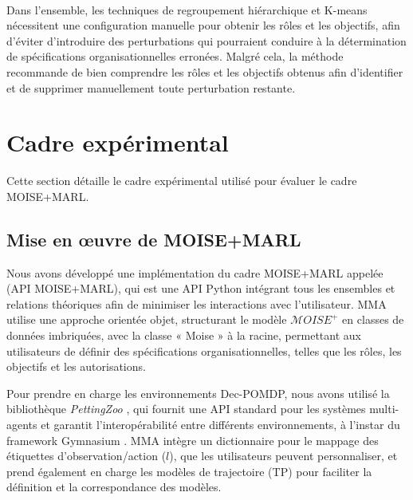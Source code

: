 \

Dans l'ensemble, les techniques de regroupement hiérarchique et K-means nécessitent une configuration manuelle pour obtenir les rôles et les objectifs, afin d'éviter d'introduire des perturbations qui pourraient conduire à la détermination de spécifications organisationnelles erronées. Malgré cela, la méthode recommande de bien comprendre les rôles et les objectifs obtenus afin d'identifier et de supprimer manuellement toute perturbation restante.

\section{Cadre expérimental}
\label{sec:experimental_setup}

Cette section détaille le cadre expérimental utilisé pour évaluer le cadre MOISE+MARL.%

\subsection{Mise en œuvre de MOISE+MARL}

Nous avons développé une implémentation du cadre MOISE+MARL appelée ~\hyperref[fn:github]{\footnotemark[1]} (API MOISE+MARL), qui est une API Python intégrant tous les ensembles et relations théoriques afin de minimiser les interactions avec l'utilisateur. MMA utilise une approche orientée objet, structurant le modèle $\mathcal{M}OISE^+$ en classes de données imbriquées, avec la classe « Moise » à la racine, permettant aux utilisateurs de définir des spécifications organisationnelles, telles que les rôles, les objectifs et les autorisations.

Pour prendre en charge les environnements Dec-POMDP, nous avons utilisé la bibliothèque \textit{PettingZoo} \cite{terry2020pettingzoo}, qui fournit une API standard pour les systèmes multi-agents et garantit l'interopérabilité entre différents environnements, à l'instar du framework Gymnasium \cite{kwiatkowski2024}. MMA intègre un dictionnaire pour le mappage des étiquettes d'observation/action ($l$), que les utilisateurs peuvent personnaliser, et prend également en charge les modèles de trajectoire (TP) pour faciliter la définition et la correspondance des modèles.

